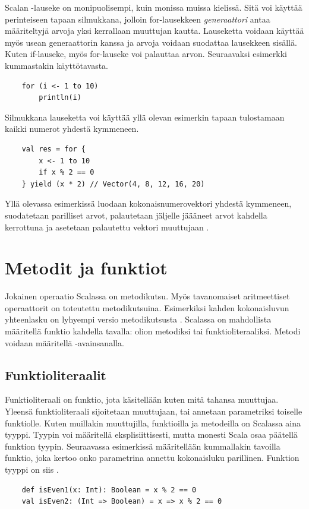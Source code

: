 Scalan -lauseke on monipuolisempi, kuin monissa muissa kielissä. Sitä voi käyttää perinteiseen tapaan silmukkana, jolloin for-lausekkeen \textit{generaattori} antaa määriteltyjä arvoja yksi kerrallaan muuttujan  kautta. Lauseketta voidaan käyttää myös usean generaattorin kanssa ja arvoja voidaan suodattaa lausekkeen sisällä. Kuten if-lauseke, myös for-lauseke voi palauttaa arvon. Seuraavaksi esimerkki kummastakin käyttötavasta.
\begin{lstlisting}
    for (i <- 1 to 10)
        println(i)
\end{lstlisting}
Silmukkana lauseketta voi käyttää yllä olevan esimerkin tapaan tulostamaan kaikki numerot yhdestä kymmeneen.
\begin{lstlisting}
    val res = for {
        x <- 1 to 10
        if x % 2 == 0
    } yield (x * 2) // Vector(4, 8, 12, 16, 20)
\end{lstlisting}
Yllä olevassa esimerkissä luodaan kokonaisnumerovektori yhdestä kymmeneen, suodatetaan parilliset arvot, palautetaan jäljelle jäääneet arvot kahdella kerrottuna ja asetetaan palautettu vektori muuttujaan .
\cite[Luku 2.6]{scalaForTheImpatient}


\section{Metodit ja funktiot} \label{MetoditJaFunktiot}
Jokainen operaatio Scalassa on metodikutsu. Myös tavanomaiset aritmeettiset operaattorit on toteutettu metodikutsuina. Esimerkiksi kahden kokonaisluvun yhteenlasku  on lyhyempi versio metodikutsusta . Scalassa on mahdollista määritellä funktio kahdella tavalla: olion metodiksi tai funktioliteraaliksi. Metodi voidaan määritellä -avainsanalla.
\cite[Luku 1.4]{scalaForTheImpatient}

\subsection{Funktioliteraalit}
Funktioliteraali on funktio, jota käsitellään kuten mitä tahansa muuttujaa. Yleensä funktioliteraali sijoitetaan muuttujaan, tai annetaan parametriksi toiselle funktiolle. Kuten muillakin muuttujilla, funktioilla ja metodeilla on Scalassa aina tyyppi. Tyypin voi määritellä eksplisiittisesti, mutta monesti Scala osaa päätellä funktion tyypin.
Seuraavassa esimerkissä määritellään kummallakin tavoilla funktio, joka kertoo onko parametrina annettu kokonaisluku parillinen. Funktion tyyppi on siis .
\cite[Luku 8]{prorgrammingInScala3rd}
\begin{lstlisting}
    def isEven1(x: Int): Boolean = x % 2 == 0
    val isEven2: (Int => Boolean) = x => x % 2 == 0
\end{lstlisting}

